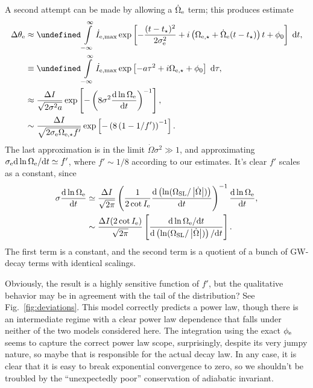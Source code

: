 \documentclass[11pt,
        usenames, %
        dvipsnames %
    ]{article}
\newcommand*{\rd}[2]{\frac{\mathrm{d}#1}{\mathrm{d}#2}}
\newcommand*{\rdil}[2]{\mathrm{d}#1 / \mathrm{d}#2}
\newcommand*{\abs}[1]{\left|#1\right|}
\newcommand*{\p}[1]{\left(#1\right)}
\newcommand*{\s}[1]{\left[#1\right]}
\let\Re\undefined
\DeclareMathOperator{\Re}{Re}
\begin{document}
A second attempt can be made by allowing a $\dot{\Omega}_{\rm e}$ term; this
produces estimate
\begin{align}
    \Delta \theta_{\rm e} &\approx \Re \int\limits_{-\infty}^\infty
        \dot{I}_{\rm e, \max} \exp\s{
            -\frac{(t - t_\star)^2}{2\sigma_{\rm e}^2} + i
            \p{\Omega_{\rm e,\star} + \dot{\Omega}_{\rm e}(t - t_\star)} t
            + \phi_0}\;\mathrm{d}t,\\
        &\equiv \Re \int\limits_{-\infty}^\infty
        \dot{I}_{\rm e, \max} \exp\s{
            - a\tau^2 + i\Omega_{\rm e,\star}
            + \phi_0}\;\mathrm{d}\tau,\\
        &\approx \frac{\Delta I}{\sqrt{2\sigma^2 a}}
            \exp\s{-\p{8\sigma^2\rd{\ln \Omega_{\rm e}}{t}}^{-1}},\\
        &\sim \frac{\Delta I}{\sqrt{2 \sigma_{\rm e} {\Omega}_{\rm e,\star}f'}}
            \exp\s{-\p{8\p{1 - 1/f'}}
            ^{-1}}.
\end{align}
The last approximation is in the limit $\dot{\Omega}\sigma^2 \gg 1$, and
approximating $\sigma_{\rm e}\rdil{\ln \Omega_{\rm e}}{t} \simeq f'$, where $f'
\sim 1/8$ according to our estimates. It's clear $f'$ scales as a constant,
since
\begin{align}
    \sigma \rd{\ln \Omega_{\rm e}}{t} &\simeq \frac{\Delta I}{\sqrt{2\pi}}
        \p{\frac{1}{2\cot I_{\rm e}}\rd{\p{\ln (\Omega_{\rm
            SL}/\abs{\dot{\Omega}})}}{t}}^{-1} \rd{\ln \Omega_{\rm e}}{t},\\
        &\sim \frac{\Delta I (2\cot I_{\rm e})}{\sqrt{2\pi}}
            \s{\frac{\rdil{\ln \Omega_{\rm e}}{t}}{
            \rdil{\p{\ln (\Omega_{\rm SL}/\abs{\dot{\Omega}})}}{t}}}.
\end{align}
The first term is a constant, and the second term is a quotient of a bunch of
GW-decay terms with identical scalings.

Obviously, the result is a highly sensitive function of $f'$, but the
qualitative behavior may be in agreement with the tail of the distribution? See
Fig.~\ref{fig:deviations}. This model correctly predicts a power law, though
there is an intermediate regime with a clear power law dependence that falls
under neither of the two models considered here. The integration using the exact
$\phi_{\rm e}$ seems to capture the correct power law scope, surprisingly,
despite its very jumpy nature, so maybe that is responsible for the actual decay
law. In any case, it is clear that it is easy to break exponential convergence
to zero, so we shouldn't be troubled by the ``unexpectedly poor'' conservation
of adiabatic invariant.
\end{document}
